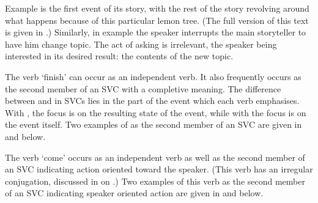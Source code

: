 Example  is the first event of its story,
with the rest of the story revolving around what
happens because of this particular lemon tree.
(The full version of this text is given in .)
Similarly, in example  the speaker
interrupts the main storyteller to have him change topic.
The act of asking is irrelevant, the speaker being interested
in its desired result: the contents of the new topic.

The verb  `finish' can occur as an independent verb.
It also frequently occurs as the second member of an SVC with a completive meaning.
The difference between  and  in SVCs
lies in the part of the event which each verb emphasises.
With , the focus is on the resulting state of the event,
while with  the focus is on the event itself.
Two examples of  as the second member of an SVC
are given in  and  below.

\begin{exe}
	\label{ex:130825-6, 0.36}
	\label{ex:130825-7, 2.29}
\end{exe}

The verb  `come' occurs as an independent verb
as well as the second member of an SVC indicating action oriented toward the speaker.
(This verb has an irregular conjugation, discussed in  on .)
Two examples of this verb as the second member of an SVC
indicating speaker oriented action are given in
 and  below.


